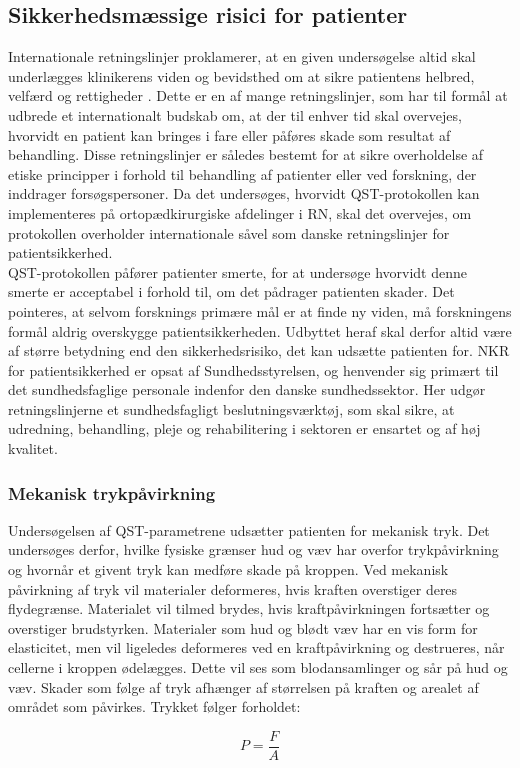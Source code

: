 \subsection{Sikkerhedsmæssige risici for patienter}
Internationale retningslinjer proklamerer, at en given undersøgelse altid skal underlægges klinikerens viden og bevidsthed om at sikre patientens helbred, velfærd og rettigheder \citep{helsinki2013}. Dette er en af mange retningslinjer, som har til formål at udbrede et internationalt budskab om, at der til enhver tid skal overvejes, hvorvidt en patient kan bringes i fare eller påføres skade som resultat af behandling. Disse retningslinjer er således bestemt for at sikre overholdelse af etiske principper i forhold til behandling af patienter eller ved forskning, der inddrager forsøgspersoner. Da det undersøges, hvorvidt QST-protokollen kan implementeres på ortopædkirurgiske afdelinger i RN, skal det overvejes, om protokollen overholder internationale såvel som danske retningslinjer for patientsikkerhed. \citep{helsinki2013} \\
QST-protokollen påfører patienter smerte, for at undersøge hvorvidt denne smerte er acceptabel i forhold til, om det pådrager patienten skader. Det pointeres, at selvom forsknings primære mål er at finde ny viden, må forskningens formål aldrig overskygge patientsikkerheden. Udbyttet heraf skal derfor altid være af større betydning end den sikkerhedsrisiko, det kan udsætte patienten for. \citep{helsinki2013} NKR for patientsikkerhed er opsat af Sundhedsstyrelsen, og henvender sig primært til det sundhedsfaglige personale indenfor den danske sundhedssektor. Her udgør retningslinjerne et sundhedsfagligt beslutningsværktøj, som skal sikre, at udredning, behandling, pleje og rehabilitering i sektoren er ensartet og af høj kvalitet. \citep{nkr2016} \citep{kommissorium2012} 

\subsubsection{Mekanisk trykpåvirkning}
Undersøgelsen af QST-parametrene udsætter patienten for mekanisk tryk. Det undersøges derfor, hvilke fysiske grænser hud og væv har overfor trykpåvirkning og hvornår et givent tryk kan medføre skade på kroppen. Ved mekanisk påvirkning af tryk vil materialer deformeres, hvis kraften overstiger deres flydegrænse. Materialet vil tilmed brydes, hvis kraftpåvirkningen fortsætter og overstiger brudstyrken. Materialer som hud og blødt væv har en vis form for elasticitet, men vil ligeledes deformeres ved en kraftpåvirkning og destrueres, når cellerne i kroppen ødelægges. Dette vil ses som blodansamlinger og sår på hud og væv. Skader som følge af tryk afhænger af størrelsen på kraften og arealet af området som påvirkes. Trykket følger forholdet: 
\vspace{-.75cm}
\begin{center}
	\begin{equation}
	P=\frac{F}{A}
	\end{equation}
\end{center}

